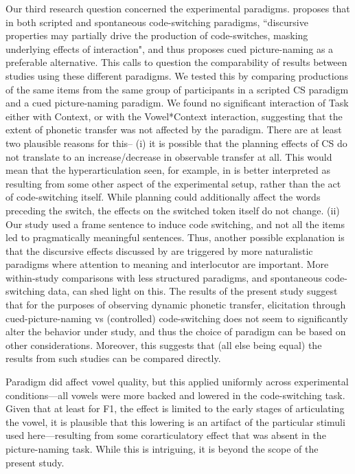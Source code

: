 \documentclass[charis,linguex]{glossa}
\begin{document}
Our third research question concerned the experimental paradigms. \cite{olson2013bilingual} proposes that in both scripted and spontaneous code-switching paradigms, ``discursive properties may partially drive the production of code-switches, masking underlying effects of interaction", and thus proposes cued picture-naming as a preferable alternative. This calls to question the comparability of results between studies using these different paradigms. We tested this by comparing productions of the same items from the same group of participants in a scripted CS paradigm and a cued picture-naming paradigm. We found no significant interaction of Task either with Context, or with the Vowel*Context interaction, suggesting that the extent of phonetic transfer was not affected by the paradigm. 
There are at least two plausible reasons for this-- (i) it is possible that the planning effects of CS do not translate to an increase/decrease in observable transfer at all. This would mean that the hyperarticulation seen, for example, in \cite{muldner2019phonetics} is better interpreted as resulting from some other aspect of the experimental setup, rather than the act of code-switching itself. While planning could additionally affect the words preceding the switch, the effects on the switched token itself do not change. (ii) Our study used a frame sentence to induce code switching, and not all the items led to pragmatically meaningful sentences. Thus, another possible explanation is that the discursive effects discussed by \cite{olson2013bilingual} are triggered by more naturalistic paradigms where attention to meaning and interlocutor are important. More within-study comparisons with less structured paradigms, and spontaneous code-switching data, can shed light on this. The results of the present study suggest that for the purposes of observing dynamic phonetic transfer, elicitation through cued-picture-naming vs (controlled) code-switching does not seem to significantly alter the behavior under study, and thus the choice of paradigm can be based on other considerations. Moreover, this suggests that (all else being equal) the results from such studies can be compared directly. 

Paradigm did affect vowel quality, but this applied uniformly across experimental conditions---all vowels were more backed and lowered in the code-switching task. Given that at least for F1, the effect is limited to the early stages of articulating the vowel, it is plausible that this lowering is an artifact of the particular stimuli used here---resulting from some corarticulatory effect that was absent in the picture-naming task. While this is intriguing, it is beyond the scope of the present study.  
\end{document}
